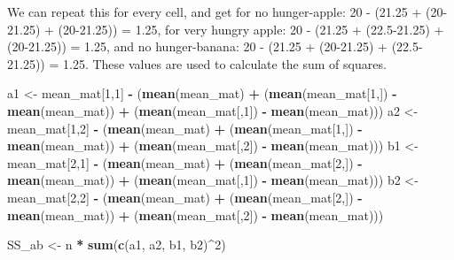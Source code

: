 \documentclass[]{article}
\newenvironment{Shaded}{\begin{snugshade}}{\end{snugshade}}
\newcommand{\KeywordTok}[1]{\textcolor[rgb]{0.13,0.29,0.53}{\textbf{#1}}}
\newcommand{\DecValTok}[1]{\textcolor[rgb]{0.00,0.00,0.81}{#1}}
\newcommand{\StringTok}[1]{\textcolor[rgb]{0.31,0.60,0.02}{#1}}
\newcommand{\OperatorTok}[1]{\textcolor[rgb]{0.81,0.36,0.00}{\textbf{#1}}}
\newcommand{\NormalTok}[1]{#1}
\begin{document}
We can repeat this for every cell, and get for no hunger-apple: 20 -
(21.25 + (20-21.25) + (20-21.25)) = 1.25, for very hungry apple: 20 -
(21.25 + (22.5-21.25) + (20-21.25)) = 1.25, and no hunger-banana: 20 -
(21.25 + (20-21.25) + (22.5-21.25)) = 1.25. These values are used to
calculate the sum of squares.

\begin{Shaded}
\begin{Highlighting}[]
\NormalTok{a1 <-}\StringTok{ }\NormalTok{mean_mat[}\DecValTok{1}\NormalTok{,}\DecValTok{1}\NormalTok{] }\OperatorTok{-}\StringTok{ }\NormalTok{(}\KeywordTok{mean}\NormalTok{(mean_mat) }\OperatorTok{+}\StringTok{ }\NormalTok{(}\KeywordTok{mean}\NormalTok{(mean_mat[}\DecValTok{1}\NormalTok{,]) }\OperatorTok{-}\StringTok{ }\KeywordTok{mean}\NormalTok{(mean_mat)) }\OperatorTok{+}\StringTok{ }\NormalTok{(}\KeywordTok{mean}\NormalTok{(mean_mat[,}\DecValTok{1}\NormalTok{]) }\OperatorTok{-}\StringTok{ }\KeywordTok{mean}\NormalTok{(mean_mat)))}
\NormalTok{a2 <-}\StringTok{ }\NormalTok{mean_mat[}\DecValTok{1}\NormalTok{,}\DecValTok{2}\NormalTok{] }\OperatorTok{-}\StringTok{ }\NormalTok{(}\KeywordTok{mean}\NormalTok{(mean_mat) }\OperatorTok{+}\StringTok{ }\NormalTok{(}\KeywordTok{mean}\NormalTok{(mean_mat[}\DecValTok{1}\NormalTok{,]) }\OperatorTok{-}\StringTok{ }\KeywordTok{mean}\NormalTok{(mean_mat)) }\OperatorTok{+}\StringTok{ }\NormalTok{(}\KeywordTok{mean}\NormalTok{(mean_mat[,}\DecValTok{2}\NormalTok{]) }\OperatorTok{-}\StringTok{ }\KeywordTok{mean}\NormalTok{(mean_mat)))}
\NormalTok{b1 <-}\StringTok{ }\NormalTok{mean_mat[}\DecValTok{2}\NormalTok{,}\DecValTok{1}\NormalTok{] }\OperatorTok{-}\StringTok{ }\NormalTok{(}\KeywordTok{mean}\NormalTok{(mean_mat) }\OperatorTok{+}\StringTok{ }\NormalTok{(}\KeywordTok{mean}\NormalTok{(mean_mat[}\DecValTok{2}\NormalTok{,]) }\OperatorTok{-}\StringTok{ }\KeywordTok{mean}\NormalTok{(mean_mat)) }\OperatorTok{+}\StringTok{ }\NormalTok{(}\KeywordTok{mean}\NormalTok{(mean_mat[,}\DecValTok{1}\NormalTok{]) }\OperatorTok{-}\StringTok{ }\KeywordTok{mean}\NormalTok{(mean_mat)))}
\NormalTok{b2 <-}\StringTok{ }\NormalTok{mean_mat[}\DecValTok{2}\NormalTok{,}\DecValTok{2}\NormalTok{] }\OperatorTok{-}\StringTok{ }\NormalTok{(}\KeywordTok{mean}\NormalTok{(mean_mat) }\OperatorTok{+}\StringTok{ }\NormalTok{(}\KeywordTok{mean}\NormalTok{(mean_mat[}\DecValTok{2}\NormalTok{,]) }\OperatorTok{-}\StringTok{ }\KeywordTok{mean}\NormalTok{(mean_mat)) }\OperatorTok{+}\StringTok{ }\NormalTok{(}\KeywordTok{mean}\NormalTok{(mean_mat[,}\DecValTok{2}\NormalTok{]) }\OperatorTok{-}\StringTok{ }\KeywordTok{mean}\NormalTok{(mean_mat)))}

\NormalTok{SS_ab <-}\StringTok{ }\NormalTok{n }\OperatorTok{*}\StringTok{ }\KeywordTok{sum}\NormalTok{(}\KeywordTok{c}\NormalTok{(a1, a2, b1, b2)}\OperatorTok{^}\DecValTok{2}\NormalTok{)}
\end{Highlighting}
\end{Shaded}
\end{document}
